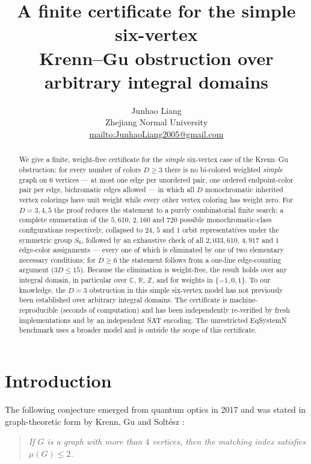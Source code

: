 \documentclass[11pt]{article}
\title{A finite certificate for the simple six-vertex\\[0.3em]
Krenn--Gu obstruction over arbitrary integral domains}
\author{Junhao Liang\\[0.4em]
Zhejiang Normal University\\[0.2em]
\url{mailto:JunhaoLiang2005@gmail.com}}
\date{}
\theoremstyle{definition}
\begin{document}
\maketitle

\begin{abstract}
We give a finite, weight-free certificate for the \emph{simple}
six-vertex case of the Krenn--Gu obstruction: for every number of
colors $D\ge 3$ there is no bi-colored weighted \emph{simple} graph on
$6$ vertices --- at most one edge per unordered pair, one ordered
endpoint-color pair per edge, bichromatic edges allowed --- in which
all $D$ monochromatic inherited vertex colorings have unit weight while
every other vertex coloring has weight zero. For $D=3,4,5$ the proof
reduces the statement to a purely combinatorial finite search: a
complete enumeration of the $5{,}610$, $2{,}160$ and $720$ possible
monochromatic-class configurations respectively, collapsed to $24$,
$5$ and $1$ orbit representatives under the symmetric group $S_6$,
followed by an exhaustive check of all $2{,}033{,}610$, $4{,}917$ and
$1$ edge-color assignments --- every one of which is eliminated by one
of two elementary necessary conditions; for $D\ge 6$ the statement
follows from a one-line edge-counting argument ($3D\le 15$). Because
the elimination is weight-free, the result holds over any integral
domain, in particular over $\mathbb C$, $\mathbb R$, $\mathbb Z$, and
for weights in $\{-1,0,1\}$. To our knowledge, the $D=3$ obstruction in
this simple six-vertex model has not previously been established over
arbitrary integral domains. The certificate is machine-reproducible
(seconds of computation) and has been independently re-verified by
fresh implementations and by an independent SAT encoding. The
unrestricted EqSystemN benchmark uses a broader model and is outside
the scope of this certificate.
\end{abstract}

\section{Introduction}\label{sec:intro}

The following conjecture emerged from quantum optics in 2017
\cite{KGZ17} and was stated in graph-theoretic form by Krenn, Gu and
Solt\'esz \cite{KGS19}:

\begin{quote}
\emph{If $G$ is a graph with more than $4$ vertices, then the matching
index satisfies $\mu(G)\le 2$.}
\end{quote}
\end{document}
